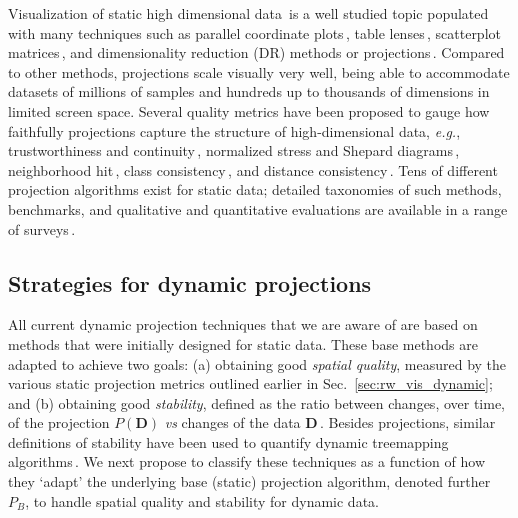 Visualization of static high dimensional data\,\citep{Liu2017} is a well studied topic populated with many techniques such as parallel coordinate plots\,\citep{Inselberg1990}, table lenses\,\citep{Rao2003}, scatterplot matrices\,\citep{Becker1996}, and dimensionality reduction (DR) methods or projections\,\citep{vanderMaaten2009}. Compared to other methods, projections scale visually very well, being able to accommodate datasets of millions of samples and hundreds up to thousands of dimensions in limited screen space. Several quality metrics have been proposed to gauge how faithfully projections capture the structure of high-dimensional data, \emph{e.g.}, trustworthiness and continuity\,\citep{venna06}, normalized stress and Shepard diagrams\,\citep{Joia2011}, neighborhood hit\,\citep{Paulovich2008}, class consistency\,\citep{tatu10}, and distance consistency\,\citep{sips09}. Tens of different projection algorithms exist for static data; detailed taxonomies of such methods, benchmarks, and qualitative and quantitative evaluations are available in a range of surveys\,\citep{Nonato2019,Espadoto19,fodor02_survey,cunningham15_survey,sorzano14_survey,vanderMaaten2009}.


\subsection{Strategies for dynamic projections} 
\label{sec:taxonomy}
%
All current dynamic projection techniques that we are aware of are based on methods that were initially designed for static data. These base methods are adapted to achieve two goals: (a) obtaining good \emph{spatial quality}, measured by the various static projection metrics outlined earlier in Sec.~\ref{sec:rw_vis_dynamic}; and (b) obtaining good \emph{stability}, defined as the ratio between changes, over time, of the projection $P(\mathbf{D})$ \emph{vs} changes of the data $\mathbf{D}$\,\citep{Vernier2020}. Besides projections, similar definitions of stability have been used to quantify dynamic treemapping algorithms\,\citep{vernier_treemap,vernier18software}.  We next propose to classify these techniques as a function of how they `adapt' the underlying base (static) projection algorithm, denoted further $P_B$, to handle spatial quality and stability for dynamic data.

